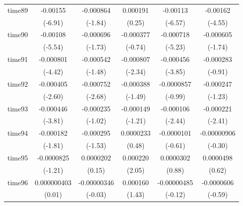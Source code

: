 \begin{table}[htbp]
\begin{tabular}{l*{5}{c}}
time89      &    -0.00155\sym{***}&   -0.000864         &    0.000191         &    -0.00113\sym{***}&    -0.00162\sym{***}\\
            &     (-6.91)         &     (-1.84)         &      (0.25)         &     (-6.57)         &     (-4.55)         \\
time90      &    -0.00108\sym{***}&   -0.000696         &   -0.000377         &   -0.000718\sym{***}&   -0.000605         \\
            &     (-5.54)         &     (-1.73)         &     (-0.74)         &     (-5.23)         &     (-1.74)         \\
time91      &   -0.000801\sym{***}&   -0.000542         &   -0.000807\sym{*}  &   -0.000456\sym{***}&   -0.000283         \\
            &     (-4.42)         &     (-1.48)         &     (-2.34)         &     (-3.85)         &     (-0.91)         \\
time92      &   -0.000405\sym{**} &   -0.000752\sym{**} &   -0.000388         &  -0.0000857         &   -0.000247         \\
            &     (-2.60)         &     (-2.68)         &     (-1.49)         &     (-0.99)         &     (-1.23)         \\
time93      &   -0.000446\sym{***}&   -0.000235         &   -0.000149         &   -0.000106\sym{*}  &   -0.000221\sym{*}  \\
            &     (-3.81)         &     (-1.02)         &     (-1.21)         &     (-2.44)         &     (-2.41)         \\
time94      &   -0.000182         &   -0.000295         &   0.0000233         &  -0.0000101         & -0.00000906         \\
            &     (-1.81)         &     (-1.53)         &      (0.48)         &     (-0.61)         &     (-0.30)         \\
time95      &  -0.0000825         &   0.0000202         &    0.000220\sym{*}  &   0.0000302         &   0.0000498         \\
            &     (-1.21)         &      (0.15)         &      (2.05)         &      (0.88)         &      (0.62)         \\
time96      & 0.000000403         & -0.00000346         &    0.000160         & -0.00000485         &  -0.0000606         \\
            &      (0.01)         &     (-0.03)         &      (1.43)         &     (-0.12)         &     (-0.59)         \\

\end{tabular}
\end{table}
